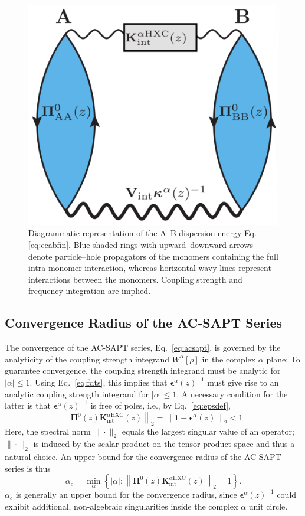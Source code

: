 \documentclass[journal=jctcce,manuscript=article]{achemso}
\begin{document}
\begin{figure}[hbtp]
  \centering
  \includegraphics[width=0.5\linewidth]{int_gold.eps}
  \caption{Diagrammatic representation of the A--B dispersion energy
    Eq. \eqref{eq:ecabfin}. Blue-shaded rings with upward--downward
    arrows denote particle--hole propagators of the monomers containing
    the full intra-monomer interaction, whereas horizontal wavy lines
    represent interactions between the monomers. Coupling strength and
    frequency integration are implied.}
  \label{fig:goldstone}
\end{figure}

\subsection{Convergence Radius of the AC-SAPT Series}

The convergence of the AC-SAPT series, Eq.~\eqref{eq:acsapt}, is governed by
the analyticity of the coupling strength 
integrand $W^\alpha[\rho]$ in the complex $\alpha$ plane: To
guarantee convergence, the 
coupling strength integrand must be analytic for $|\alpha| \le
1$. Using Eq.~\eqref{eq:fdts}, this implies that
$\boldsymbol{\epsilon}^\alpha(z)^{-1}$ must give rise to an analytic
coupling strength integrand for $|\alpha| \le
1$. A necessary condition for the latter is that
$\boldsymbol{\epsilon}^\alpha(z)^{-1}$ is free of poles, i.e., by
Eq.~\eqref{eq:epsdef},
\begin{equation}
  \label{eq:conv}
  \left\| \boldsymbol{\Pi}^0(z) \mathbf{K}^{\alpha\text{HXC}}_\text{int}(z)
    \right\|_2 = \left\| \mathbf{1} -
    \boldsymbol{\epsilon}^\alpha(z) \right\|_2 < 1. 
\end{equation}
Here, the spectral norm $\|\cdot\|_2$ equals the largest singular value
of an operator; $\|\cdot\|_2$ is induced by the scalar product on the
tensor product space and thus a natural choice. An upper bound for the
convergence radius of the AC-SAPT series is thus
\begin{equation}
  \label{eq:alphac}
  \alpha_c = \min_{\alpha}\left\{ |\alpha| : \left\| 
        \boldsymbol{\Pi}^0(z)
        \mathbf{K}^{\alpha\text{HXC}}_\text{int}(z) 
    \right\|_2 = 1
    \right\}.
\end{equation}
$\alpha_c$ is generally an upper bound for the convergence radius, since
$\boldsymbol{\epsilon}^\alpha(z)^{-1}$ could exhibit additional,
non-algebraic singularities inside the complex $\alpha$ unit
circle.
\end{document}
